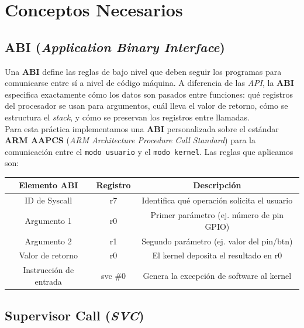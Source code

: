 \documentclass[12pt,letterpaper]{article}
\begin{document}
\newpage

\section*{Conceptos Necesarios}

\subsection*{ABI (\textit{Application Binary Interface})}

Una \textbf{ABI} define las reglas de bajo nivel que deben seguir los programas para comunicarse entre sí a nivel de código máquina. A diferencia de las \textit{API}, la \textbf{ABI} especifica exactamente cómo los datos son pasados entre funciones: qué registros del procesador se usan para argumentos, cuál lleva el valor de retorno, cómo se estructura el \textit{stack}, y cómo se preservan los registros entre llamadas.\\

\noindent
Para esta práctica implementamos una \textbf{ABI} personalizada sobre el estándar \textbf{ARM AAPCS} (\textit{ARM Architecture Procedure Call Standard}) para la comunicación entre el \texttt{modo usuario} y el \texttt{modo kernel}. Las reglas que aplicamos son:

\hspace{-1cm}
\begin{table}[h]
  \centering
  \begin{tabular}{|c|c|c|}
    \hline
    \textbf{Elemento ABI} & \textbf{Registro} & \textbf{Descripción} \\
    \hline
    ID de Syscall & r7 & Identifica qué operación solicita el usuario \\
    \hline
    Argumento 1 & r0 & Primer parámetro (ej. número de pin GPIO) \\
    \hline
    Argumento 2 & r1 & Segundo parámetro (ej. valor del pin/btn) \\
    \hline
    Valor de retorno & r0 & El kernel deposita el resultado en r0 \\
    \hline
    Instrucción de entrada & svc \#0 & Genera la excepción de software al kernel \\
    \hline
  \end{tabular}
\end{table}

\subsection*{Supervisor Call (\textit{SVC})}
\end{document}

